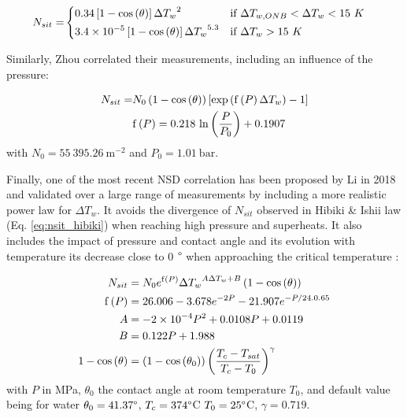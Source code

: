 \begin{align}
N_{sit}=&
\begin{dcases}
0.34\left[ 1-\mathrm{cos}\left( \theta \right) \right] {\Delta T_{w}}^{2} & \text{if } \Delta T_{w,ONB}<\Delta T_{w} < 15\ K\\
3.4\times 10^{-5}\left[ 1-\mathrm{cos}\left( \theta \right) \right] {\Delta T_{w}}^{5.3} & \text{if } \Delta T_{w} > 15\ K
\end{dcases}
\label{eq:nsit_basu}
\end{align}

\npar

Similarly, Zhou \etal \cite{zhou_nsd} correlated their measurements, including an influence of the pressure:

\begin{align}
N_{sit} =& N_{0}\left( 1-\mathrm{cos}\left( \theta \right) \right)\left[ \mathrm{exp}\left( \mathrm{f}\left( P \right) \Delta T_{w}  \right) -1  \right]
\label{eq:nsit_zhou}\\
&\mathrm{f}\left( P \right) = 0.218~\mathrm{ln}\left( \dfrac{P}{P_{0}} \right)+0.1907
\end{align}
with $N_{0}=55~395.26\ \mathrm{m}^{-2}$ and $P_{0}=1.01\ \mathrm{bar}$.

\npar

Finally, one of the most recent NSD correlation has been proposed by Li \etal in 2018 \cite{li_new_2018} and validated over a large range of measurements by including a more realistic power law for $\Delta T_{w}$. It avoids the divergence of $N_{sit}$ observed in Hibiki \& Ishii law (Eq. \ref{eq:nsit_hibiki}) when reaching high pressure and superheats. It also includes the impact of pressure and contact angle and its evolution with temperature \eg its decrease close to 0 $\degree$ when approaching the critical temperature \cite{song_fan_contact_angle}:


\begin{align}
N_{sit} &= N_{0}e^{\mathrm{f}\parth{P}} {\Delta T_{w}}^{A\Delta T_{w} + B} \parth{1- \cos{\theta}}
\label{eq:nsit_li}\\
%
\mathrm{f}\parth{P} &= 26.006 - 3.678 e^{-2P} - 21.907e^{-P / 24.0.65}\\
%
A &= -2\times 10^{-4} P^{2} + 0.0108P + 0.0119\\
%
B &= 0.122P +1.988\\
%
1-\cos{\theta} &= \parth{1-\cos{\theta_{0}}}\parth{\frac{T_{c}-T_{sat}}{T_{c}-T_{0}}}^{\gamma}
\end{align}
with $P$ in MPa, $\theta_{0}$ the contact angle at room temperature $T_{0}$, and default value being for water $\theta_{0}=41.37 \degree$, $T_{c}=374 \degree$C $T_{0}=25\degree$C, $\gamma = 0.719$.

